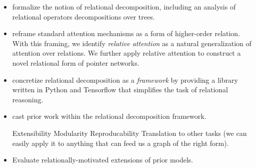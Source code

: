 \begin{itemize}
\item formalize the notion of relational decomposition, including an analysis of 
relational operators decompositions over trees.

\item reframe standard attention mechanisms as a form of higher-order relation.  
	With this framing, we identify \textit{relative attention} as a natural 
	generalization of attention over relations.
	We further apply relative attention to construct a novel relational form of 
	pointer networks.

\item concretize relational decomposition as a \textit{framework} by providing a 
library written in Python and Tensorflow that simplifies the task of relational 
reasoning.


\item cast prior work within the relational decomposition framework.

Extensibility
Modularity
Reproducability
Translation to other tasks (we can easily apply it to anything that can feed us 
a graph of the right form).

\item Evaluate relationally-motivated extensions of prior models.
\end{itemize}

%
